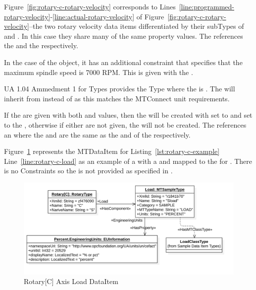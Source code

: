 Figure~\ref{fig:rotary-c-rotary-velocity} corresponds to Lines~\ref{line:programmed-rotary-velocity}-\ref{line:actual-rotary-velocity} of Figure~\ref{fig:rotary-c-rotary-velocity}--the two rotary velocity data items differentiated by their \glspl{subType} of  and . In this case they share many of the same property values. The  references the  and the  respectively.

In the case of the  object, it has an additional constraint that specifies that the maximum spindle speed is 7000 RPM. This is given with the . 

UA 1.04 Ammedment 1 \cite{UAAmend1} for  \glspl{Type} provides the \gls{Type}  where the  is . The  will inherit from  instead of   as this matches the MTConnect unit requirements.

If the  are given with both  and  values, then the  will be created with  set to  and  set to the , otherwise if either are not given, the  will not be created. The  references an  where the  and  are the same as the  and  of the  respectively. 

\FloatBarrier

Figure~\ref{fig:rotary-c-load} represents the  \gls{MTDataItem} for Listing~\ref{lst:rotary-c-example} Line~\ref{line:rotary-c-load} as an example of a  with a  and mapped to the  for . There is no \glspl{Constraint} so the  is not provided as specified in \cite{UAPart8}.

\begin{figure}[ht]
  \centering
  \includegraphics[width=1.0\textwidth]{diagrams/mtconnect-mapping/rotary-c-load.png}
  \caption{Rotary[C] Axis Load DataItem}
  \label{fig:rotary-c-load}
\end{figure}

